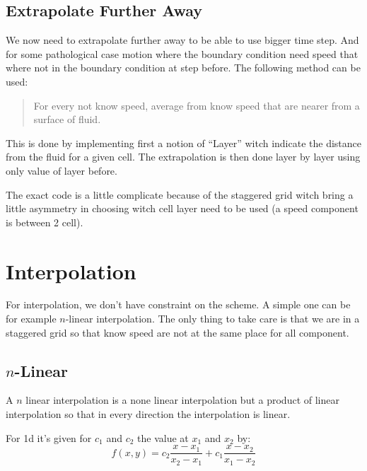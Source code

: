 \subsection{Extrapolate Further Away}

We now need to extrapolate further away to be able to use bigger time step.
And for some pathological case motion where the boundary condition need speed that  where not in the boundary condition at step before.
The following method can be used:
\begin{quote}
For every not know speed, average from know speed that are nearer from a surface of fluid.
\end{quote}
This is done by implementing first a notion of ``Layer'' witch indicate the distance from the fluid for a given cell.
The extrapolation is then done layer by layer using only value of layer before.

The exact code is a little complicate because of the staggered grid witch bring a little asymmetry in choosing witch cell layer need to be used
(a speed component is between 2 cell).


\section{Interpolation}

For interpolation, we don't have constraint on the scheme. A simple one can be for example $n$-linear interpolation.
The only thing to take care is that we are in a staggered grid so that know speed are not at the same place
for all component.

\subsection{$n$-Linear}

A $n$ linear interpolation is a none linear interpolation but a product of linear interpolation so that in every direction the interpolation is linear.

For 1d it's given for $c_1$ and $c_2$ the value at $x_1$ and $x_2$ by:
\begin{equation}
	f(x,y)=c_2\frac{x-x_{1}}{x_{2}-x_{1}}+c_1\frac{x-x_{2}}{x_{1}-x_{2}}
\end{equation}

